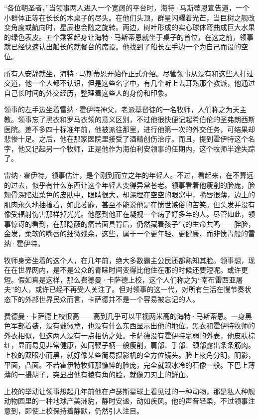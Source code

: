 \documentclass[AutoFakeBold=true]{book}
\begin{document}
``各位朝圣者，''当领事两人进入一个宽阔的平台时，海特·马斯蒂恩宣告道，一个小群体正等在长长的木桌子的尽头。在他们头顶，群星闪耀着光芒，当巨树之舰改变角度或航向时，星辰也会随之旋转。两边，树叶形成的实心球体弯曲成巨大水果的绿色表皮。五个乘客起身让海特·马斯蒂恩就坐于桌子的首位，在这之前，领事就已经快速认出船长的就餐台的席设。他找到了船长左手边一个为自己而设的空位。

所有人安静就坐，海特·马斯蒂恩开始作正式介绍。尽管领事从没有和这些人打过交道，他一个人都不认识，但是这些名字中，有几个听上去耳熟那个教派，他通过自己长时间的外交经历，整理着这些人的身份和印象。

领事的左手边坐着雷纳·霍伊特神父，老派基督徒的一名牧师，人们称之为天主教。领事忘了黑衣和罗马衣领的意义区别，不过他很快便记起希伯伦的圣弗朗西斯医院。差不多四十标准年前，他被派往那里，进行他第一次的外交任务，可结果却悲惨十足。之后，他在那家医院里接受了酒精创伤治疗。而且，提到霍伊特这个名字，他又记起另一个牧师，正是他作为海伯利安领事的任期内，这个牧师半途失踪了。

雷纳·霍伊特，领事估计，是个刚到而立之年的年轻人。不过，看起来，在不算远的过去，似乎有什么东西让这个年轻人变得异常苍老。领事看着他瘦削的脸庞，脸颊骨深陷进菜色的皮肤中，眼睛很大，却深埋在空空的眼窝中，嘴唇很薄，边上的肌肉永久地抽搐着，如此萎靡，甚至不能说他是在愤世嫉俗的苦笑。但头发并没有像受辐射伤害那样掉光光。他感到他正在凝视一个病了好多年的人。尽管如此，领事惊讶的看到，在那隐蔽的痛苦面具背后，仍然藏着孩子气的生命共鸣——胖脸，金发，柔软的嘴唇的细微残余，这些，属于一个更年轻、更健康、而非愤青般的雷纳·霍伊特。

牧师身旁坐着的这个人，在几年前，绝大多数霸主公民还都熟知其脸。领事想，现在在世界网内，是不是公众的青睐时间变得比他住在那的时候还要短呢。或许更短。假如真是这样，那么费德曼·卡萨德上校，这个人们称之为``南布雷西亚屠夫''的人，或许已经不再受人关注了。但对领事的这一代，对所有生活在慢节奏状态下的外部世界民众而言，卡萨德并不是一个容易被忘记的人。

费德曼·卡萨德上校很高——高到几乎可以平视两米高的海特·马斯蒂恩。一身黑色军部着装，没有戴徽章，也没有什么东西显示出他的地位。黑衣和霍伊特牧师的外衣相似，但这两人没有一点相仿之处。卡萨德没有霍伊特羸弱的外表，他皮肤棕红，显而易见非常健康，如同鞭子柄一般瘦削，肩部、手部、颈部露出条条筋肉。上校的双眼小而黑，就好像某些简易摄影机的全方位镜头。脸上棱角分明，阴影，平面，凸面。不若霍伊特牧师那憔悴的脸庞，完全就跟冰冷的石像一般。下巴上薄薄的一撮胡子，突显出他有棱有角的脸，就像刀刃上的鲜血。

上校的举动让领事想起几年前他在卢瑟斯星球上看见过的一种动物，那是私人种舰动物园里的一种地球产美洲豹，静时安谧，动如疾风。他的声音轻柔，不过领事注意到，即使上校保持着静默，仍然引人注目。
\end{document}
